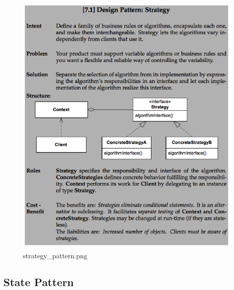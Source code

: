 \documentclass[11pt]{article}
\makeatletter
\def\maxwidth{\ifdim\Gin@nat@width>\linewidth\linewidth
    \else\Gin@nat@width\fi}
\let\Oldincludegraphics\includegraphics
\renewcommand{\includegraphics}[1]{\Oldincludegraphics[width=.8\maxwidth]{#1}}
\makeatother
\begin{document}
\begin{figure}
\centering
\includegraphics{img/strategy_pattern.png}
\caption{strategy\_pattern.png}
\end{figure}

\hypertarget{state-pattern}{%
\subsection{State Pattern}\label{state-pattern}}
\end{document}
